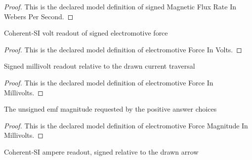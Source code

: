 \begin{proof}
  This is the declared model definition of signed Magnetic Flux Rate In Webers Per Second.
\end{proof}
\begin{definition}
  \label{def:physics:phyx-mini-0935:phyxminiproblems-problemphyxmini0935-electromotiveforceinvolts}
  Coherent-SI volt readout of signed electromotive force
\end{definition}
\begin{proof}
  This is the declared model definition of electromotive Force In Volts.
\end{proof}
\begin{definition}
  \label{def:physics:phyx-mini-0935:phyxminiproblems-problemphyxmini0935-electromotiveforceinmillivolts}
  Signed millivolt readout relative to the drawn current traversal
\end{definition}
\begin{proof}
  This is the declared model definition of electromotive Force In Millivolts.
\end{proof}
\begin{definition}
  \label{def:physics:phyx-mini-0935:phyxminiproblems-problemphyxmini0935-electromotiveforcemagnitudeinmillivolts}
  The unsigned emf magnitude requested by the positive answer choices
\end{definition}
\begin{proof}
  This is the declared model definition of electromotive Force Magnitude In Millivolts.
\end{proof}
\begin{definition}
  \label{def:physics:phyx-mini-0935:phyxminiproblems-problemphyxmini0935-electriccurrentinamperes}
  Coherent-SI ampere readout, signed relative to the drawn arrow
\end{definition}
